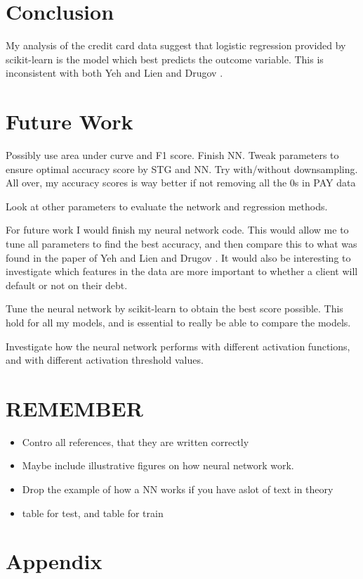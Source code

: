 \documentclass[a4paper,11pt,twocolumn]{article}
\begin{document}
\section{Conclusion}
My analysis of the credit card data suggest that logistic regression provided by scikit-learn is the model which best predicts the outcome variable. This is inconsistent with both Yeh and Lien \cite{data} and Drugov \cite{vladimir}.    

\section{Future Work}
Possibly use area under curve and F1 score. Finish NN. Tweak parameters to ensure optimal accuracy score by STG and NN. Try with/without downsampling. All over, my accuracy scores is way better if not removing all the 
0s in PAY data

Look at other parameters to evaluate the network and regression methods.

For future work I would finish my neural network code. This would allow me to tune all parameters to find the best accuracy, and then compare this to what was found in the paper of Yeh and Lien and Drugov \cite{vladimir}. It would also be interesting to investigate which features in the data are more important to whether a client will default or not on their debt.   

Tune the neural network by scikit-learn to obtain the best score possible. This hold for all my models, and is essential to really be able to compare the models. 

Investigate how the neural network performs with different activation functions, and with different activation threshold values.  

\section{REMEMBER}
\begin{itemize}
\item Contro all references, that they are written correctly 
\item Maybe include illustrative figures on how neural network work.
\item Drop the example of how a NN works if you have aslot of text in theory
\item table for test, and table for train
\end{itemize}
 
\section{Appendix}
\end{document}
